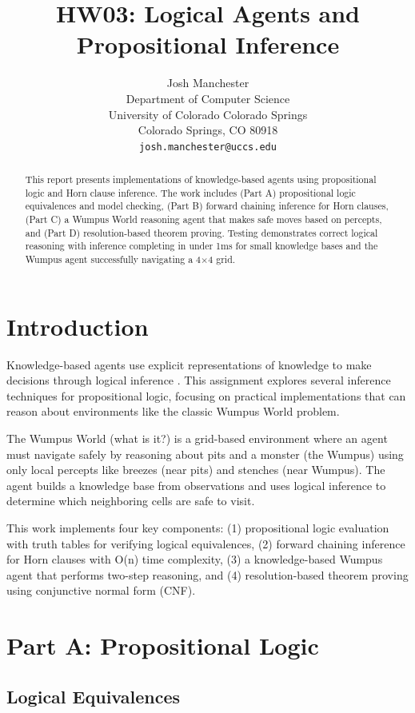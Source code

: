 \documentclass[letterpaper]{article}
\title{HW03: Logical Agents and Propositional Inference}
\author{
    Josh Manchester\\
    Department of Computer Science\\
    University of Colorado Colorado Springs\\
    Colorado Springs, CO 80918\\
    \texttt{josh.manchester@uccs.edu}
}
\begin{document}
\maketitle

\begin{abstract}
This report presents implementations of knowledge-based agents using propositional logic and Horn clause inference. The work includes (Part A) propositional logic equivalences and model checking, (Part B) forward chaining inference for Horn clauses, (Part C) a Wumpus World reasoning agent that makes safe moves based on percepts, and (Part D) resolution-based theorem proving. Testing demonstrates correct logical reasoning with inference completing in under 1ms for small knowledge bases and the Wumpus agent successfully navigating a 4$\times$4 grid.
\end{abstract}

\section{Introduction}

Knowledge-based agents use explicit representations of knowledge to make decisions through logical inference \cite{russell2020artificial,atyabi2025lecture8}. This assignment explores several inference techniques for propositional logic, focusing on practical implementations that can reason about environments like the classic Wumpus World problem.

The Wumpus World (what is it?) is a grid-based environment where an agent must navigate safely by reasoning about pits and a monster (the Wumpus) using only local percepts like breezes (near pits) and stenches (near Wumpus). The agent builds a knowledge base from observations and uses logical inference to determine which neighboring cells are safe to visit.

This work implements four key components: (1) propositional logic evaluation with truth tables for verifying logical equivalences, (2) forward chaining inference for Horn clauses with O(n) time complexity, (3) a knowledge-based Wumpus agent that performs two-step reasoning, and (4) resolution-based theorem proving using conjunctive normal form (CNF).

\section{Part A: Propositional Logic}

\subsection{Logical Equivalences}
\end{document}
